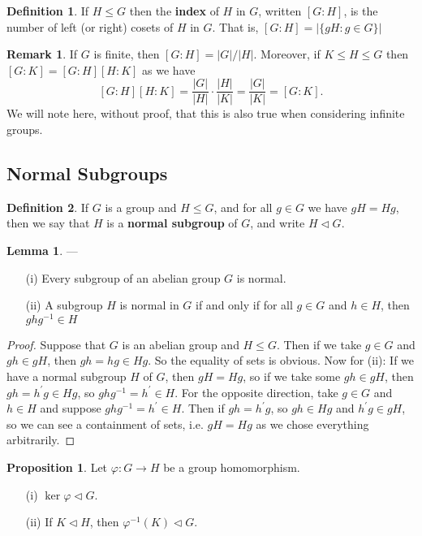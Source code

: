 \documentclass[9pt,reqno]{amsart}
\theoremstyle{definition}
\newtheorem{defi}{Definition}[section]
\newtheorem{lemma}{Lemma}[section]
\newtheorem{rem}{Remark}[section]
\newtheorem{prop}{Proposition}[section]
\newcommand{\pp}{\prime}
\begin{document}
\begin{defi}
If $H \leq G$ then the \textbf{index} of $H$ in $G$, written $[G \colon H]$, is the number of left (or right) cosets of $H$ in $G$. That is, $[G \colon H] = | \{gH \colon g \in G \} |$	
\end{defi}
\begin{rem}
If $G$ is finite, then $[G \colon H ] = |G| / |H|$.	Moreover, if $K \leq H \leq G$ then $[G \colon K ] = [G \colon H ] [H \colon K]$ as we have $$[G \colon H ] [H \colon K] = \frac{|G|}{|H|} \cdot \frac{|H|}{|K|} = \frac{|G|}{|K|} = [G \colon K]. $$ We will note here, without proof, that this is also true when considering infinite groups. 
\end{rem}




\subsection{Normal Subgroups}
\begin{defi}
If $G$ is a group and $H \leq G$, and for all $g \in G$ we have $gH = Hg$, then we say that $H$ is a \textbf{normal subgroup} of $G$, and write $H \lhd G$. 	
\end{defi}
\begin{lemma} —
	\begin{itemize}
		\item[(i)] Every subgroup of an abelian group $G$ is normal.
		\item[(ii)] A subgroup $H$ is normal in $G$ if and only if for all $g \in G$ and $h \in H$, then $ghg^{-1} \in H$
	\end{itemize}
\end{lemma}
\begin{proof}
	Suppose that $G$ is an abelian group and $H \leq G$. Then if we take $g \in G$ and $gh \in gH$, then $gh = hg \in Hg$. So the equality of sets is obvious. Now for (ii): If we have a normal subgroup $H$ of $G$, then $gH = Hg$, so if we take some $gh \in gH$, then $gh = h^\pp g \in Hg$, so $ghg^{-1} = h^\pp \in H$. For the opposite direction, take $g \in G$ and $h \in H$ and suppose $ghg^{-1} = h^\pp \in H$. Then if $gh = h^\pp g$, so $gh \in Hg$ and $h^\pp g \in gH$, so we can see a containment of sets, i.e. $gH = Hg$ as we chose everything arbitrarily. 
	\end{proof}
	\begin{prop}
		Let $\varphi \colon G \to H$ be a group homomorphism.
		\begin{itemize}
			\item [(i)] $\ker \varphi \lhd G$. 
			\item [(ii)] If $K \lhd H$, then $\varphi^{-1} (K) \lhd G$. 
		\end{itemize}
	\end{prop}
\end{document}
